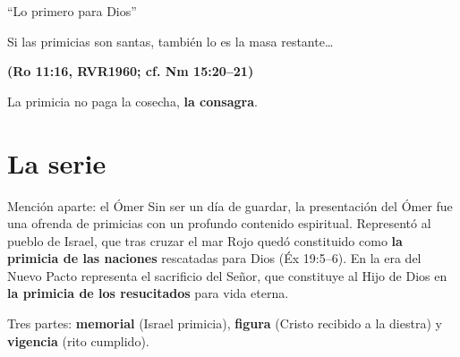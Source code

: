 \documentclass[hyperref={bookmarks=false},aspectratio=169]{beamer}
\newcommand{\fuente}[1]{\par\hfill{\upshape\bfseries\footnotesize\textcolor{tierraroja}{#1}}}
\newcommand{\destacar}[1]{\textbf{\textcolor{tierraroja}{#1}}}
\begin{document}
\begin{frame}{``Lo primero para Dios''}
\centering
{}\par\medskip
\begin{cita}Si las primicias son santas, también lo es la masa restante\ldots\fuente{(Ro 11:16, RVR1960; cf. Nm 15:20--21)}\end{cita}
\small\RaggedRight La primicia no paga la cosecha, \destacar{la consagra}.
\end{frame}

\section{La serie}

\begin{frame}{Mención aparte: el Ómer}
\small\RaggedRight Sin ser un día de guardar, la presentación del Ómer fue una ofrenda de primicias con un profundo contenido espiritual. Representó al pueblo de Israel, que tras cruzar el mar Rojo quedó constituido como \destacar{la primicia de las naciones} rescatadas para Dios (Éx 19:5--6). En la era del Nuevo Pacto representa el sacrificio del Señor, que constituye al Hijo de Dios en \destacar{la primicia de los resucitados} para vida eterna.\par\medskip
\small\RaggedRight Tres partes: \destacar{memorial} (Israel primicia), \destacar{figura} (Cristo recibido a la diestra) y \destacar{vigencia} (rito cumplido).
\end{frame}
\end{document}
